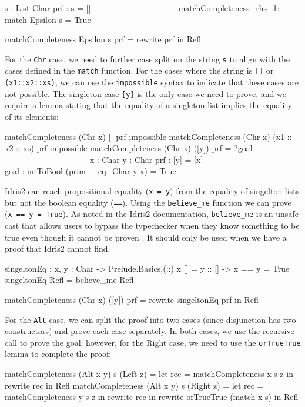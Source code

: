 \documentclass[]{rptuseminar}
\begin{document}
\begin{idris}
s : List Char
prf : s = []
------------------------------
matchCompleteness_rhs_1: match Epsilon s = True

matchCompleteness Epsilon s prf = rewrite prf in Refl
\end{idris}

For the \texttt{Chr} case, we need to further case split on the string \texttt{s} to align with the cases defined in the \texttt{match} function. For the cases where the string is \texttt{[]} or \texttt{(x1::x2::xs)}, we can use the \texttt{impossible} syntax to indicate that these cases are not possible. The singleton case \texttt{[y]} is the only case we need to prove, and we require a lemma stating that the equality of a singleton list implies the equality of its elements:

\begin{idris}
matchCompleteness (Chr x) [] prf impossible 
matchCompleteness (Chr x) (x1 :: x2 :: xs) prf impossible 
matchCompleteness (Chr x) ([y]) prf = ?goal
------------------------------
x : Char
y : Char
prf : [y] = [x]
------------------------------
goal : intToBool (prim__eq_Char y x) = True
\end{idris}

Idris2 can reach propositional equality (\texttt{x = y}) from the equality of singelton lists but not the boolean equality (\texttt{==}).
Using the \texttt{believe\_me} function we can prove (\texttt{x == y = True}). As noted in the Idris2 documentation, \texttt{believe\_me} is an unsafe cast that allows users to bypass the typechecker when they know something to be true even though it cannot be proven \cite{idris2-believeme}. It should only be used when we have a proof that Idris2 cannot find.

\begin{idris}
singeltonEq : {x, y : Char} -> Prelude.Basics.(::) x [] = y :: [] -> x == y = True
singeltonEq Refl = believe_me Refl 

matchCompleteness (Chr x) ([y]) prf = rewrite singeltonEq prf in Refl
\end{idris}

For the \texttt{Alt} case, we can split the proof into two cases (since disjunction has two constructors) and prove each case separately. In both cases, we use the recursive call to prove the goal; however, for the Right case, we need to use the \texttt{orTrueTrue} lemma to complete the proof:

\begin{idris}
matchCompleteness (Alt x y) s (Left z) = let rec = matchCompleteness x s z in 
    rewrite rec in Refl 
matchCompleteness (Alt x y) s (Right z) = let rec = matchCompleteness y s z in 
    rewrite rec in rewrite orTrueTrue (match x s) in Refl 
\end{idris}
\end{document}
